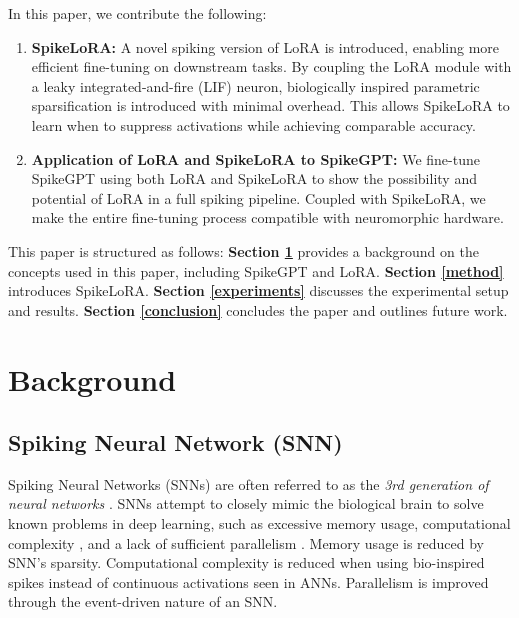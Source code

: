 \documentclass{article} %
\begin{document}
In this paper, we contribute the following:
\begin{enumerate}
  \item \textbf{SpikeLoRA:} A novel spiking version of LoRA is introduced, enabling more efficient fine-tuning on downstream tasks. By coupling the LoRA module with a leaky integrated-and-fire (LIF) neuron, biologically inspired parametric sparsification is introduced with minimal overhead. This allows SpikeLoRA to learn when to suppress activations while achieving comparable accuracy.
  \item \textbf{Application of LoRA and SpikeLoRA to SpikeGPT:} We fine-tune SpikeGPT \citep{zhu_spikegpt_2024-1} using both LoRA and SpikeLoRA to show the possibility and potential of LoRA in a full spiking pipeline. Coupled with SpikeLoRA, we make the entire fine-tuning process compatible with neuromorphic hardware.
\end{enumerate}

This paper is structured as follows: \textbf{Section \ref{background}} provides a background on the concepts used in this paper, including SpikeGPT and LoRA. \textbf{Section \ref{method}} introduces SpikeLoRA. \textbf{Section \ref{experiments}} discusses the experimental setup and results. \textbf{Section \ref{conclusion}} concludes the paper and outlines future work. %

\section{Background}
\label{background}
\subsection{Spiking Neural Network (SNN)}
\label{SNN}
Spiking Neural Networks (SNNs) are often referred to as the \emph{3rd generation of neural networks} \citep{capatina_efficient_2023,maass_networks_1997-1,yang_sdit_2024}. SNNs attempt to closely mimic the biological brain to solve known problems in deep learning, such as excessive memory usage, computational complexity \citep{eshraghian_training_2023-1}, and a lack of sufficient parallelism \citep{pfeiffer_deep_2018}. Memory usage is reduced by SNN's sparsity. Computational complexity is reduced when using bio-inspired spikes instead of continuous activations seen in ANNs. Parallelism is improved through the event-driven nature of an SNN.
\end{document}

